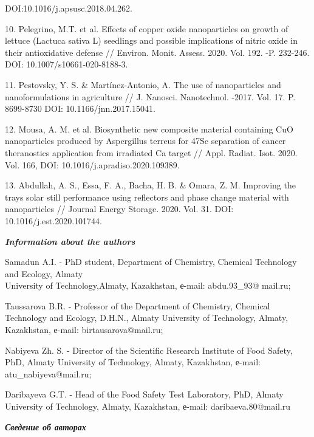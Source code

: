 \begin{noparindent}
DOI:10.1016/j.apsusc.2018.04.262.

10. Pelegrino, M.T. et al. Effects of copper oxide nanoparticles on growth
of lettuce (Lactuca sativa L) seedlings and possible implications of
nitric oxide in their antioxidative defense // Environ. Monit. Assess.
2020. Vol. 192. -P. 232-246. DOI: 10.1007/s10661-020-8188-3.

11. Pestovsky, Y. S. \& Martínez-Antonio, A. The use of nanoparticles and
nanoformulations in agriculture // J. Nanosci. Nanotechnol. -2017.
Vol. 17. P. 8699-8730 DOI: 10.1166/jnn.2017.15041.

12. Mousa, A. M. et al. Biosynthetic new composite material containing CuO
nanoparticles produced by Aspergillus terreus for 47Sc separation of
cancer theranostics application from irradiated Ca target // Appl.
Radiat. Isot. 2020. Vol. 166, DOI: 10.1016/j.apradiso.2020.109389.

13. Abdullah, A. S., Essa, F. A., Bacha, H. B. \& Omara, Z. M. Improving
the trays solar still performance using reflectors and phase change
material with nanoparticles // Journal Energy Storage. 2020. Vol. 31.
DOI: 10.1016/j.est.2020.101744.
\end{noparindent}

\emph{{\bfseries Information about the authors}}

\begin{noparindent}
Samadun A.I. - PhD student, Department of Chemistry, Chemical Technology
and Ecology, Almaty \\University of Technology,Almaty, Kazakhstan, е-mail:
abdu.93\_93@ mail.ru;

Taussarova B.R. - Professor of the Department of Chemistry, Chemical
Technology and Ecology, D.H.N., Almaty University of Technology, Almaty,
Kazakhstan, е-mail: birtausarova@mail.ru;

Nabiyeva Zh. S. - Director of the Scientific Research Institute of Food
Safety, PhD, Almaty University of Technology, Almaty, Kazakhstan,
е-mail: atu\_nabiyeva@mail.ru;

Daribayeva G.T. - Head of the Food Safety Test Laboratory, PhD, Almaty
University of Technology, Almaty, Kazakhstan, е-mail:
daribaeva.80@mail.ru
\end{noparindent}

\emph{{\bfseries Сведение об авторах}}

